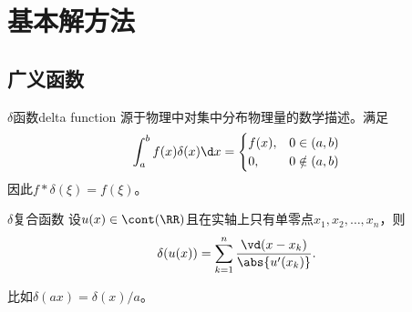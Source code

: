 \chapter{基本解方法}
\section{广义函数}
\begin{definition}{$\delta$函数}{delta function}
	源于物理中对集中分布物理量的数学描述。满足
	\[
		\int_a^bf(x)\delta(x)\d x=
		\begin{cases}
			f(x),&0\in(a,b)\\
			0,&0\notin(a,b)
		\end{cases}
	\]
	因此$f\ast\delta(\xi)=f(\xi)$。
\end{definition}
\begin{theorem}{$\delta$复合函数}{}
	设$u(x)\in\cont(\RR)$且在实轴上只有单零点$x_1,x_2,\ldots,x_n$，则 
	\begin{align}
		\delta(u(x))=\sum_{k=1}^n\frac{\vd(x-x_k)}{\abs{u'(x_k)}}.
	\end{align}
\end{theorem}
比如$\delta(ax)=\delta(x)/a$。

